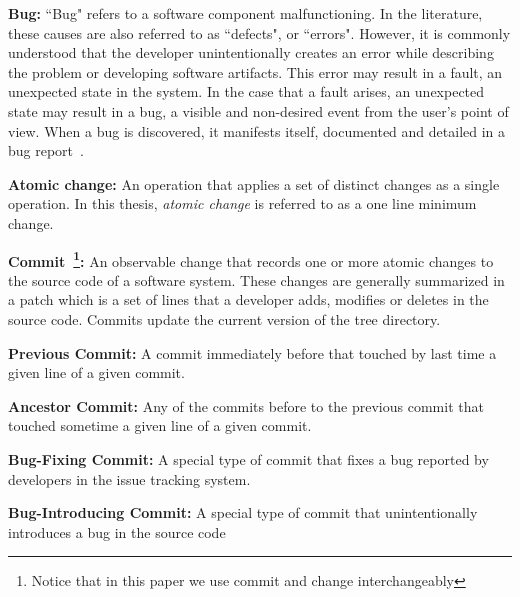 \documentclass[a4paper, 12pt]{book}
\begin{document}
\textbf{Bug:} ``Bug" refers to a software component malfunctioning. In the literature, these causes are also referred to as ``defects", or ``errors". However, it is commonly understood that the developer unintentionally creates an error while describing the problem or developing software artifacts. This error may result in a fault, an unexpected state in the system. In the case that a fault arises, an unexpected state may result in a bug, a visible and non-desired event from the user's point of view. When a bug is discovered, it manifests itself, documented and detailed in a bug report~\cite{antoniol2008bug}. 

\textbf{Atomic change:} An operation that applies a set of distinct changes as a single operation. In this thesis, \emph{atomic change} is referred to as a one line minimum change.

\textbf{Commit~\footnote{Notice that in this paper we use commit and change interchangeably}:} An observable change that records one or more atomic changes to the source code of a software system. These changes are generally summarized in a patch which is a set of lines that a developer adds, modifies or deletes in the source code. Commits update the current version of the tree directory.

\textbf{Previous Commit:} A commit immediately before that touched by last time a given line of a given commit. %

\textbf{Ancestor Commit:} Any of the commits before to the previous commit that touched sometime a given line of a given commit. %

\textbf{Bug-Fixing Commit:} A special type of commit that fixes a bug reported by developers in the issue tracking system.

\textbf{Bug-Introducing Commit:} A special type of commit that unintentionally introduces a bug in the source code
\end{document}
